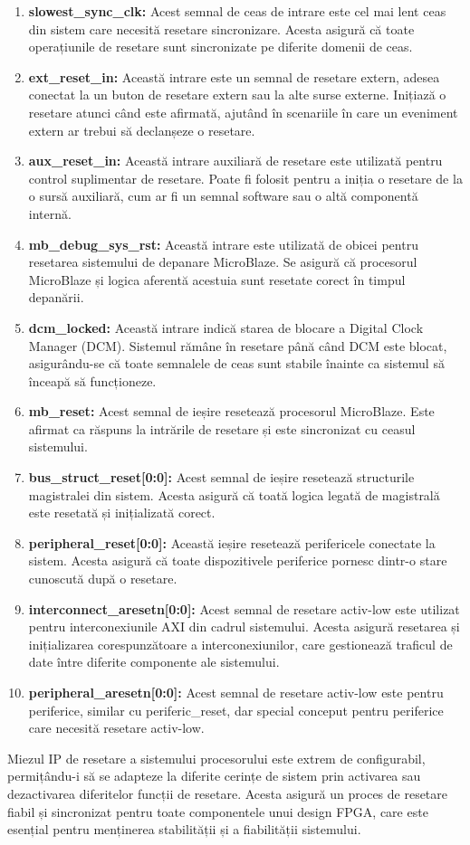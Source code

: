 \documentclass[12pt]{article}
\begin{document}
\begin{enumerate}
    \item \textbf{slowest\_sync\_clk:} Acest semnal de ceas de intrare este cel mai lent ceas din sistem care necesită resetare sincronizare. Acesta asigură că toate operațiunile de resetare sunt sincronizate pe diferite domenii de ceas.
    \item \textbf{ext\_reset\_in:} Această intrare este un semnal de resetare extern, adesea conectat la un buton de resetare extern sau la alte surse externe. Inițiază o resetare atunci când este afirmată, ajutând în scenariile în care un eveniment extern ar trebui să declanșeze o resetare.
    \item \textbf{aux\_reset\_in:} Această intrare auxiliară de resetare este utilizată pentru control suplimentar de resetare. Poate fi folosit pentru a iniția o resetare de la o sursă auxiliară, cum ar fi un semnal software sau o altă componentă internă.
    \item \textbf{mb\_debug\_sys\_rst:} Această intrare este utilizată de obicei pentru resetarea sistemului de depanare MicroBlaze. Se asigură că procesorul MicroBlaze și logica aferentă acestuia sunt resetate corect în timpul depanării.
    \item \textbf{dcm\_locked:} Această intrare indică starea de blocare a Digital Clock Manager (DCM). Sistemul rămâne în resetare până când DCM este blocat, asigurându-se că toate semnalele de ceas sunt stabile înainte ca sistemul să înceapă să funcționeze.
    \item \textbf{mb\_reset:} Acest semnal de ieșire resetează procesorul MicroBlaze. Este afirmat ca răspuns la intrările de resetare și este sincronizat cu ceasul sistemului.
    \item \textbf{bus\_struct\_reset[0:0]:} Acest semnal de ieșire resetează structurile magistralei din sistem. Acesta asigură că toată logica legată de magistrală este resetată și inițializată corect.
    \item \textbf{peripheral\_reset[0:0]:} Această ieșire resetează perifericele conectate la sistem. Acesta asigură că toate dispozitivele periferice pornesc dintr-o stare cunoscută după o resetare.
    \item \textbf{interconnect\_aresetn[0:0]:} Acest semnal de resetare activ-low este utilizat pentru interconexiunile AXI din cadrul sistemului. Acesta asigură resetarea și inițializarea corespunzătoare a interconexiunilor, care gestionează traficul de date între diferite componente ale sistemului.
    \item \textbf{peripheral\_aresetn[0:0]:} Acest semnal de resetare activ-low este pentru periferice, similar cu periferic\_reset, dar special conceput pentru periferice care necesită resetare activ-low.
\end{enumerate}
\hspace*{1cm}Miezul IP de resetare a sistemului procesorului este extrem de configurabil, permițându-i să se adapteze la diferite cerințe de sistem prin activarea sau dezactivarea diferitelor funcții de resetare. Acesta asigură un proces de resetare fiabil și sincronizat pentru toate componentele unui design FPGA, care este esențial pentru menținerea stabilității și a fiabilității sistemului.
\end{document}
